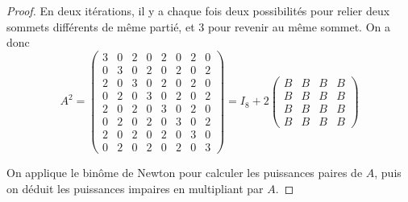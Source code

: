 \documentclass[12pt]{article}
\begin{document}
\begin{proof}
    En deux itérations, il y a chaque fois deux possibilités pour relier deux sommets différents de même partié, et 3 pour revenir au même sommet. On a donc 
    \begin{equation}
        A^{2}=
        \begin{pmatrix}
            3 &0 &2 &0 &2 &0 &2 &0\\
            0 &3 &0 &2 &0 &2 &0 &2\\
            2 &0 &3 &0 &2 &0 &2 &0\\
            0 &2 &0 &3 &0 &2 &0 &2\\
            2 &0 &2 &0 &3 &0 &2 &0\\
            0 &2 &0 &2 &0 &3 &0 &2\\
            2 &0 &2 &0 &2 &0 &3 &0\\
            0 &2 &0 &2 &0 &2 &0 &3
        \end{pmatrix}
        =I_{8}+2
        \begin{pmatrix}
            B &B &B &B\\
            B &B &B &B\\
            B &B &B &B\\
            B &B &B &B
        \end{pmatrix}
    \end{equation}

    On applique le binôme de Newton pour calculer les puissances paires de $A$, puis on déduit les puissances impaires en multipliant par $A$.
\end{proof}
\end{document}
